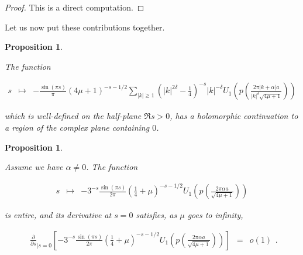 \documentclass{jams-l}
\newtheorem{proposition}[theorem]{Proposition}
\theoremstyle{definition}
\theoremstyle{remark}
\numberwithin{equation}{section}
\begin{document}
            \begin{proof}
            
                This is a direct computation.
            
            \end{proof}
            
            Let us now put these contributions together.
            
            \begin{proposition}
            \label{PropA6}
            
                The function
                
                \[ \begin{array}{lll}
                        s & \longmapsto & - \frac{\sin \left( \pi s \right)}{\pi} \left( 4 \mu + 1 \right)^{-s-1/2} \sum\limits_{\left \vert k \right \vert \geqslant 1} \left( \left \vert k \right \vert^{2 \delta} - \frac{1}{4} \right)^{-s} \left \vert k \right \vert^{- \delta} U_1 \left( p \left( \frac{2 \pi \left \vert k + \alpha \right \vert a}{\left \vert k \right \vert^{\delta} \sqrt{4 \mu + 1}} \right) \right)
                    \end{array} \]
                    
                \noindent which is well-defined on the half-plane $\Re s > 0$, has a holomorphic continuation to a region of the complex plane containing $0$.
            
            \end{proposition}
            
            \begin{proposition}
            \label{PropA6-0}
            
                Assume we have $\alpha \neq 0$. The function
                
                \[ \begin{array}{lll}
                        s & \longmapsto & - 3^{-s} \frac{\sin \left( \pi s \right)}{2 \pi} \left( \frac{1}{4} + \mu \right)^{-s-1/2} U_1 \left( p \left( \frac{2 \pi \alpha a}{\sqrt{4 \mu + 1}} \right) \right)
                    \end{array} \]
                
                \noindent is entire, and its derivative at $s=0$ satisfies, as $\mu$ goes to infinity,
                
                \[ \begin{array}{lll}
                        \scriptstyle \frac{\partial}{\partial s}_{\left \vert s = 0 \right.} \left[ - 3^{-s} \frac{\sin \left( \pi s \right)}{2 \pi} \left( \frac{1}{4} + \mu \right)^{-s-1/2} U_1 \left( p \left( \frac{2 \pi \alpha a}{\sqrt{4 \mu + 1}} \right) \right) \right] & \scriptstyle = & \scriptstyle o \left( 1 \right)
                    \end{array} . \]
            
            \end{proposition}
            
\end{document}
